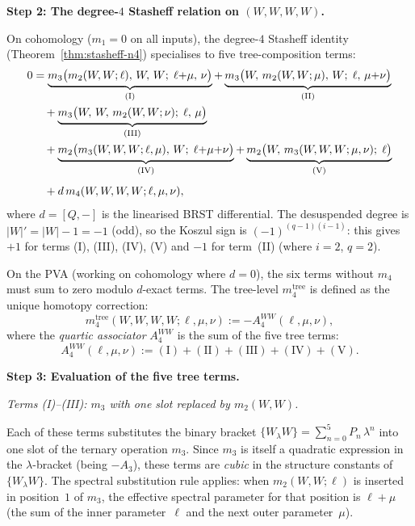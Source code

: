 \medskip
\noindent\textbf{Step 2: The degree-$4$ Stasheff relation on $(W,W,W,W)$.}

On cohomology ($m_1 = 0$ on all inputs), the degree-$4$ Stasheff
identity (Theorem~\ref{thm:stasheff-n4}) specialises to five
tree-composition terms:
\begin{align}
\label{eq:stasheff-4-WWWW}
0 &= \underbrace{m_3\bigl(m_2(W,W;\ell),\, W,\, W;\;
 \ell{+}\mu,\, \nu\bigr)}_{\mathrm{(I)}}
+ \underbrace{m_3\bigl(W,\, m_2(W,W;\mu),\, W;\;
 \ell,\, \mu{+}\nu\bigr)}_{\mathrm{(II)}} \notag\\
&\quad + \underbrace{m_3\bigl(W,\, W,\, m_2(W,W;\nu);\;
 \ell,\, \mu\bigr)}_{\mathrm{(III)}} \notag\\
&\quad + \underbrace{m_2\bigl(m_3(W,W,W;\ell,\mu),\, W;\;
 \ell{+}\mu{+}\nu\bigr)}_{\mathrm{(IV)}}
+ \underbrace{m_2\bigl(W,\, m_3(W,W,W;\mu,\nu);\;
 \ell\bigr)}_{\mathrm{(V)}} \notag\\[4pt]
&\quad + d\,m_4(W,W,W,W;\ell,\mu,\nu),
\end{align}
where $d = [Q,-]$ is the linearised BRST differential.
The desuspended degree is $|W|' = |W| - 1 = -1$ (odd), so
the Koszul sign is $(-1)^{(q-1)(i-1)}$: this gives $+1$ for
terms (I), (III), (IV), (V) and $-1$ for term~(II)
(where $i = 2$, $q = 2$).

On the PVA (working on cohomology where $d = 0$), the six terms
without $m_4$ must sum to zero modulo $d$-exact terms. The
tree-level $m_4^{\mathrm{tree}}$ is defined as the unique
homotopy correction:
\begin{equation}
\label{eq:m4-tree-definition}
m_4^{\mathrm{tree}}(W,W,W,W;\ell,\mu,\nu)
:= -A_4^{WW}(\ell,\mu,\nu),
\end{equation}
where the \emph{quartic associator} $A_4^{WW}$ is the sum of
the five tree terms:
\begin{equation}
\label{eq:A4-definition}
A_4^{WW}(\ell,\mu,\nu)
:= \mathrm{(I)} + \mathrm{(II)} + \mathrm{(III)}
 + \mathrm{(IV)} + \mathrm{(V)}.
\end{equation}

\medskip
\noindent\textbf{Step 3: Evaluation of the five tree terms.}

\smallskip
\emph{Terms (I)--(III): $m_3$ with one slot replaced by $m_2(W,W)$.}

Each of these terms substitutes the binary bracket
$\{W_\lambda W\} = \sum_{n=0}^5 P_n\,\lambda^n$ into one slot of
the ternary operation $m_3$. Since $m_3$ is itself a quadratic
expression in the $\lambda$-bracket (being $-A_3$), these terms
are \emph{cubic} in the structure constants of $\{W_\lambda W\}$.
The spectral substitution rule applies: when $m_2(W,W;\ell)$ is
inserted in position~$1$ of $m_3$, the effective spectral parameter
for that position is $\ell + \mu$ (the sum of the inner
parameter~$\ell$ and the next outer parameter~$\mu$).


